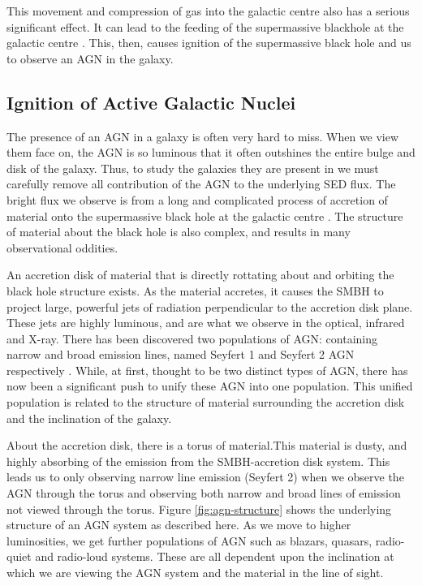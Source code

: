 This movement and compression of gas into the galactic centre also has a serious significant effect. It can lead to the feeding of the supermassive blackhole at the galactic centre \citep{Movement of gas to galactic centre causing AGN}. This, then, causes ignition of the supermassive black hole and us to observe an AGN in the galaxy.

\subsection{Ignition of Active Galactic Nuclei}
\noindent The presence of an AGN in a galaxy is often very hard to miss. When we view them face on, the AGN is so luminous that it often outshines the entire bulge and disk of the galaxy. Thus, to study the galaxies they are present in we must carefully remove all contribution of the AGN to the underlying SED flux. The bright flux we observe is from a long and complicated process of accretion of material onto the supermassive black hole at the galactic centre \citep{Paper on what an AGN actually is}. The structure of material about the black hole is also complex, and results in many observational oddities. 

An accretion disk of material that is directly rottating about and orbiting the black hole structure exists. As the material accretes, it causes the SMBH to project large, powerful jets of radiation perpendicular to the accretion disk plane. These jets are highly luminous, and are what we observe in the optical, infrared and X-ray. There has been discovered two populations of AGN: containing narrow and broad emission lines, named Seyfert 1 and Seyfert 2 AGN respectively \citep{Paper on Seyfert 1 vs Seyfert 2 galaxies}. While, at first, thought to be two distinct types of AGN, there has now been a significant push to unify these AGN into one population. This unified population is related to the structure of material surrounding the accretion disk and the inclination of the galaxy.

About the accretion disk, there is a torus of material.This material is dusty, and highly absorbing of the emission from the SMBH-accretion disk system. This leads us to only observing narrow line emission (Seyfert 2) when we observe the AGN through the torus and observing both narrow and broad lines of emission not viewed through the torus. Figure \ref{fig:agn-structure} shows the underlying structure of an AGN system as described here. As we move to higher luminosities, we get further populations of AGN such as blazars, quasars, radio-quiet and radio-loud systems. These are all dependent upon the inclination at which we are viewing the AGN system and the material in the line of sight.


